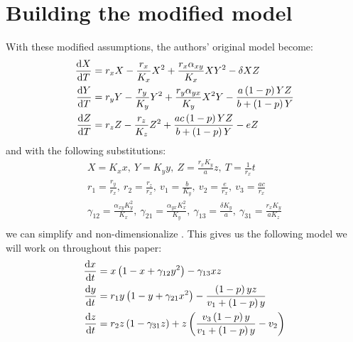 \section{Building the modified model}\label{sec:modified_model}
With these modified assumptions, the authors' original model become:
\begin{subequations}
    \begin{align}
        \diff[]{X}{T} &= r_xX-\frac{r_x}{K_x}X^2+\frac{r_x\alpha_{xy}}{K_x}XY^2-\delta XZ
        \label{model:3.1a}\\
        \diff[]{Y}{T} &= r_yY-\frac{r_y}{K_y}Y^2+\frac{r_y\alpha_{yx}}{K_y}X^2Y-\frac{a\left(1-p\right)YZ}{b+\left(1-p\right)Y}
        \label{model:3.1b}\\
        \diff[]{Z}{T} &= r_zZ-\frac{r_z}{K_z}Z^2+\frac{ac\left(1-p\right)YZ}{b+\left(1-p\right)Y}-eZ
        \label{model:3.1c}
    \end{align}
    \label{model:3.1}
\end{subequations}
and with the following substitutions:
\begin{gather*}
    X=K_xx,\ Y=K_yy,\ Z=\frac{r_xK_y}{a}z,\ T=\frac{1}{r_x}t\\
    r_1=\frac{r_y}{r_x},\ r_2=\frac{r_z}{r_x},\ v_1=\frac{b}{K_y},\ v_2=\frac{e}{r_x},\ v_3=\frac{ac}{r_x}\\
    \gamma_{12}=\frac{\alpha_{xy}K_y^2}{K_x},\ \gamma_{21}=\frac{\alpha_{yx}K_x^2}{K_y},\ \gamma_{13}=\frac{\delta K_y}{a},\ \gamma_{31}=\frac{r_xK_y}{aK_z}\\
\end{gather*}
we can simplify and non-dimensionalize . This gives us the following model we will work on throughout this paper:
\begin{subequations}
    \begin{align}
        \diff[]{x}{t} &= x\left(1-x+\gamma_{12}y^2\right)-\gamma_{13}xz
        \label{model:3.2a}\\
        \diff[]{y}{t} &= r_1y\left(1-y+\gamma_{21}x^2\right)-\frac{\left(1-p\right)yz}{v_1+\left(1-p\right)y}
        \label{model:3.2b}\\
        \diff[]{z}{t} &= r_2z\left(1-\gamma_{31}z\right)+z\left(\frac{v_3\left(1-p\right)y}{v_1+\left(1-p\right)y}-v_2\right)
        \label{model:3.2c}
    \end{align}
    \label{model:3.2}
\end{subequations}
